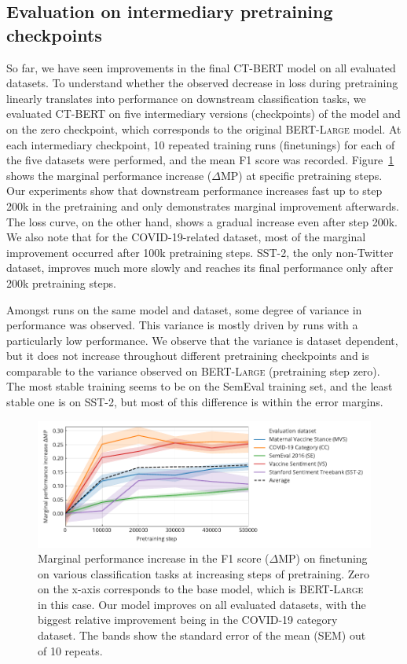 \documentclass{article}
\begin{document}
\begin{multicols}{2}

\subsection{Evaluation on intermediary pretraining checkpoints}
\label{sec:evaluation_checkpoints}
So far, we have seen improvements in the final \textsc{CT-BERT} model on all evaluated datasets.
  To understand whether the observed decrease in loss during pretraining linearly translates into performance on downstream classification tasks, we evaluated \textsc{CT-BERT} on five intermediary versions (checkpoints) of the model and on the zero checkpoint, which corresponds to the original \textsc{BERT-Large} model.
At each intermediary checkpoint, 10 repeated training runs (finetunings) for each of the five datasets were performed, and the mean F1 score was recorded.
Figure~\ref{fig:fig2} shows the marginal performance increase ($\Delta$MP) at specific pretraining steps.
Our experiments show that downstream performance increases fast up to step \num{200}k in the pretraining and only demonstrates marginal improvement afterwards.
The loss curve, on the other hand, shows a gradual increase even after step \num{200}k.
We also note that for the COVID-19-related dataset, most of the marginal improvement occurred after \num{100}k pretraining steps.
SST-2, the only non-Twitter dataset, improves much more slowly and reaches its final performance only after \num{200}k pretraining steps.

Amongst runs on the same model and dataset, some degree of variance in performance was observed.
This variance is mostly driven by runs with a particularly low performance.
We observe that the variance is dataset dependent, but it does not increase throughout different pretraining checkpoints and is comparable to the variance observed on \textsc{BERT-Large} (pretraining step zero).
The most stable training seems to be on the SemEval training set, and the least stable one is on SST-2, but most of this difference is within the error margins.

\end{multicols}
\begin{figure}[h!]
  \centering
  \includegraphics[]{fig2.pdf}
  \caption{
    Marginal performance increase in the F1 score ($\Delta$MP) on finetuning on various classification tasks at increasing steps of pretraining.
    Zero on the x-axis corresponds to the base model, which is \textsc{BERT-Large} in this case.
    Our model improves on all evaluated datasets, with the biggest relative improvement being in the COVID-19 category dataset.
    The bands show the standard error of the mean (SEM) out of 10 repeats.
  }
  \label{fig:fig2}
\end{figure}
\end{document}
